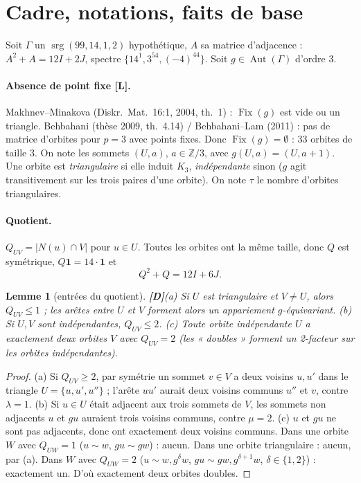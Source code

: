\documentclass[11pt,a4paper]{article}
\newtheorem{lemma}[theorem]{Lemme}
\theoremstyle{remark}
\newcommand{\Z}{\mathbb{Z}}
\newcommand{\Fix}{\operatorname{Fix}}
\newcommand{\srg}{\operatorname{srg}}
\newcommand{\Aut}{\operatorname{Aut}}
\newcommand{\st}[1]{\textbf{[#1]}}
\begin{document}
\section{Cadre, notations, faits de base}\label{sec:cadre}
Soit $\Gamma$ un $\srg(99,14,1,2)$ hypothétique, $A$ sa matrice d'adjacence : $A^2+A=12I+2J$, spectre $\{14^1,3^{54},(-4)^{44}\}$.
Soit $g\in\Aut(\Gamma)$ d'ordre 3.

\paragraph{Absence de point fixe \st{L}.} Makhnev--Minakova (Diskr.\ Mat.\ 16:1, 2004, th.~1) : $\Fix(g)$ est vide ou un triangle.
Behbahani (thèse 2009, th.~4.14) / Behbahani--Lam (2011) : pas de matrice d'orbites pour $p=3$ avec points fixes. Donc $\Fix(g)=\emptyset$ :
33 orbites de taille 3. On note les sommets $(U,a)$, $a\in\Z/3$, avec $g(U,a)=(U,a+1)$.
Une orbite est \emph{triangulaire} si elle induit $K_3$, \emph{indépendante} sinon ($g$ agit transitivement sur les trois paires d'une orbite).
On note $\tau$ le nombre d'orbites triangulaires.

\paragraph{Quotient.} $Q_{UV}=|N(u)\cap V|$ pour $u\in U$. Toutes les orbites ont la même taille, donc $Q$ est symétrique, $Q\mathbf 1=14\cdot\mathbf 1$ et
\[Q^2+Q=12I+6J .\]

\begin{lemma}[entrées du quotient] \st{D}\label{lem:entries}
(a) Si $U$ est triangulaire et $V\neq U$, alors $Q_{UV}\le 1$ ; les arêtes entre $U$ et $V$ forment alors un appariement $g$-équivariant.
(b) Si $U,V$ sont indépendantes, $Q_{UV}\le 2$.
(c) Toute orbite indépendante $U$ a exactement deux orbites $V$ avec $Q_{UV}=2$ (les « doubles » forment un 2-facteur sur les orbites indépendantes).
\end{lemma}
\begin{proof}
(a) Si $Q_{UV}\ge2$, par symétrie un sommet $v\in V$ a deux voisins $u,u'$ dans le triangle $U=\{u,u',u''\}$ ; l'arête $uu'$ aurait deux voisins communs
$u''$ et $v$, contre $\lambda=1$.
(b) Si $u\in U$ était adjacent aux trois sommets de $V$, les sommets non adjacents $u$ et $gu$ auraient trois voisins communs, contre $\mu=2$.
(c) $u$ et $gu$ ne sont pas adjacents, donc ont exactement deux voisins communs. Dans une orbite $W$ avec $Q_{UW}=1$ ($u\sim w$, $gu\sim gw$) : aucun.
Dans une orbite triangulaire : aucun, par (a). Dans $W$ avec $Q_{UW}=2$ ($u\sim w,g^\delta w$, $gu\sim gw,g^{\delta+1}w$, $\delta\in\{1,2\}$) :
exactement un. D'où exactement deux orbites doubles.
\end{proof}
\end{document}
